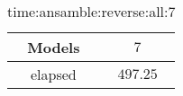 \begin{table}[!ht]
	\centering
	\begin{tabular}{|c|c|}
		\hline
		Models & $7$ \\ \hline
		elapsed & $497.25$ \\ \hline
	\end{tabular}
	\caption{time:ansamble:reverse:all:7}
	\label{tab:time:ansamble:reverse:all:7}
\end{table}
